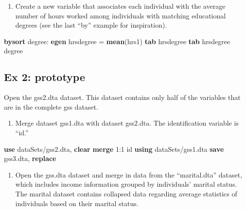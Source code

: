 \documentclass[
]{book}
\newenvironment{Shaded}{\begin{snugshade}}{\end{snugshade}}
\newcommand{\KeywordTok}[1]{\textcolor[rgb]{0.13,0.29,0.53}{\textbf{#1}}}
\newcommand{\NormalTok}[1]{#1}
\providecommand{\tightlist}{%
  \setlength{\itemsep}{0pt}\setlength{\parskip}{0pt}}
\begin{document}
\begin{enumerate}
\def\labelenumi{\arabic{enumi}.}
\setcounter{enumi}{2}
\tightlist
\item
  Create a new variable that associates each individual with the average number of hours worked among individuals with matching educational degrees (see the last ``by'' example for inspiration).
\end{enumerate}

\begin{Shaded}
\begin{Highlighting}[]
  \KeywordTok{bysort}\NormalTok{ degree: }\KeywordTok{egen}\NormalTok{ hrsdegree = }\KeywordTok{mean}\NormalTok{(hrs1)}
  \KeywordTok{tab}\NormalTok{ hrsdegree}
  \KeywordTok{tab}\NormalTok{ hrsdegree degree }
\end{Highlighting}
\end{Shaded}

\hypertarget{ex-2-prototype-5}{%
\subsection{Ex 2: prototype}\label{ex-2-prototype-5}}

Open the gss2.dta dataset. This dataset contains only half of the variables that are in the complete gss dataset.

\begin{enumerate}
\def\labelenumi{\arabic{enumi}.}
\tightlist
\item
  Merge dataset gss1.dta with dataset gss2.dta. The identification variable is ``id.''
\end{enumerate}

\begin{Shaded}
\begin{Highlighting}[]
  \KeywordTok{use}\NormalTok{ dataSets/gss2.dta, }\KeywordTok{clear}
  \KeywordTok{merge}\NormalTok{ 1:1 id }\KeywordTok{using}\NormalTok{ dataSets/gss1.dta}
  \KeywordTok{save}\NormalTok{ gss3.dta, }\KeywordTok{replace}
\end{Highlighting}
\end{Shaded}

\begin{enumerate}
\def\labelenumi{\arabic{enumi}.}
\setcounter{enumi}{1}
\tightlist
\item
  Open the gss.dta dataset and merge in data from the ``marital.dta'' dataset, which includes income information grouped by individuals' marital status. The marital dataset contains collapsed data regarding average statistics of individuals based on their marital status.
\end{enumerate}
\end{document}
